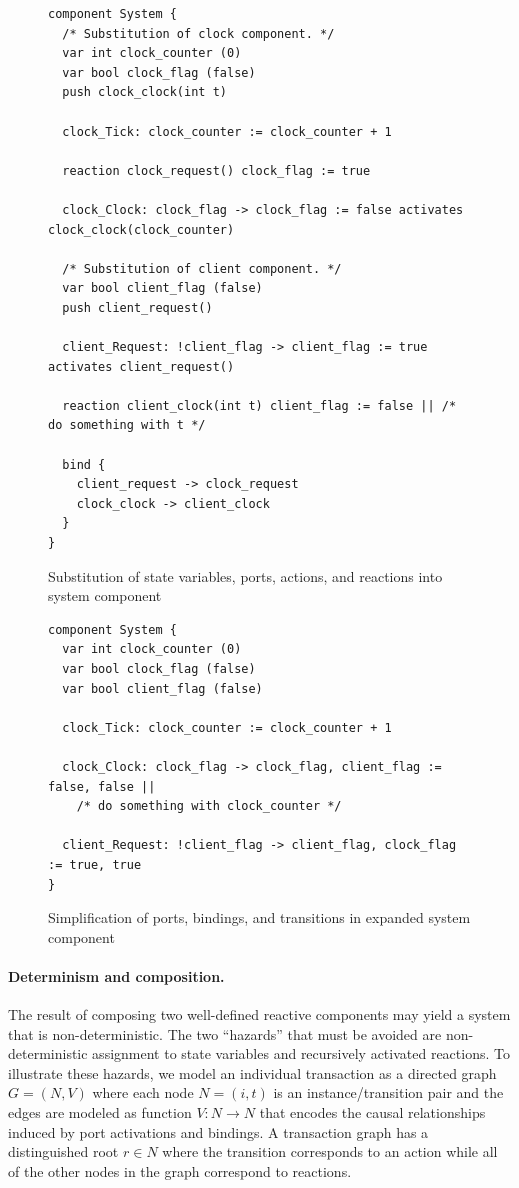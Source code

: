 \begin{figure}
\begin{verbatim}
component System {
  /* Substitution of clock component. */
  var int clock_counter (0)
  var bool clock_flag (false)
  push clock_clock(int t)

  clock_Tick: clock_counter := clock_counter + 1

  reaction clock_request() clock_flag := true

  clock_Clock: clock_flag -> clock_flag := false activates clock_clock(clock_counter)

  /* Substitution of client component. */
  var bool client_flag (false)
  push client_request()

  client_Request: !client_flag -> client_flag := true activates client_request()

  reaction client_clock(int t) client_flag := false || /* do something with t */

  bind {
    client_request -> clock_request
    clock_clock -> client_clock
  }
}
\end{verbatim}
\caption{Substitution of state variables, ports, actions, and reactions into system component\label{se1}}
\end{figure}

\begin{figure}
\begin{verbatim}
component System {
  var int clock_counter (0)
  var bool clock_flag (false)
  var bool client_flag (false)

  clock_Tick: clock_counter := clock_counter + 1

  clock_Clock: clock_flag -> clock_flag, client_flag := false, false ||
    /* do something with clock_counter */

  client_Request: !client_flag -> client_flag, clock_flag := true, true
}
\end{verbatim}
\caption{Simplification of ports, bindings, and transitions in expanded system component\label{se2}}
\end{figure}

\paragraph{Determinism and composition.}
The result of composing two well-defined reactive components may yield a system that is non-deterministic.
The two ``hazards'' that must be avoided are non-deterministic assignment to state variables and recursively activated reactions.
To illustrate these hazards, we model an individual transaction as a directed graph $G = (N,V)$ where each node $N=(i,t)$ is an instance/transition pair and the edges are modeled as function $V: N \to N$ that encodes the causal relationships induced by port activations and bindings.
A transaction graph has a distinguished root $r \in N$ where the transition corresponds to an action while all of the other nodes in the graph correspond to reactions.

